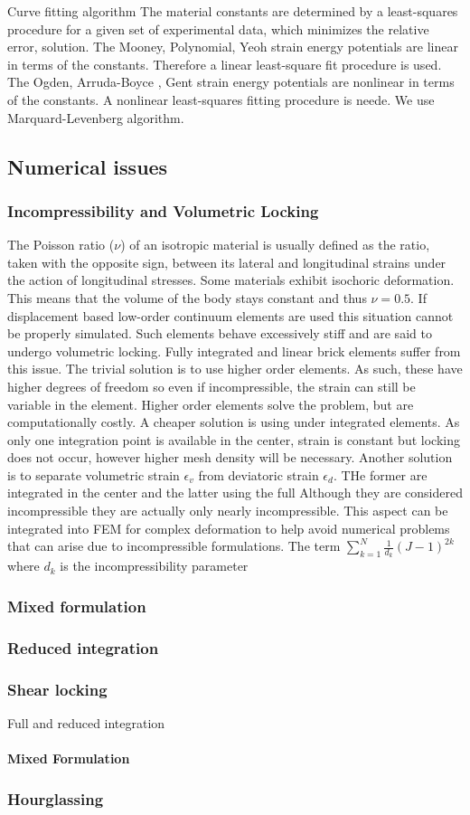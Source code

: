 Curve fitting algorithm
The material constants are determined by a least-squares procedure for a given set of experimental data, which minimizes the relative error, solution.
The Mooney, Polynomial, Yeoh strain energy potentials are linear in terms of the constants. Therefore a linear least-square fit procedure is used.
The Ogden, Arruda-Boyce , Gent strain energy potentials are nonlinear in terms of the constants. A nonlinear least-squares fitting procedure is neede. We use Marquard-Levenberg algorithm.

\subsection{Numerical issues}
\subsubsection{Incompressibility and Volumetric Locking}
The Poisson ratio ($\nu$) of an isotropic material is usually defined as the ratio, taken with the
opposite sign, between its lateral and longitudinal strains under the action of longitudinal
stresses. 
Some materials exhibit isochoric deformation. This means that the volume of the body stays constant and thus $\nu = 0.5$. If displacement based low-order continuum elements are used this situation cannot be properly simulated. Such elements behave excessively stiff and are said to undergo volumetric locking. Fully integrated and linear brick elements suffer from this issue.  The trivial solution is to use higher order elements. As such, these have higher degrees of freedom so even if incompressible, the strain can still be variable in the element. Higher order elements solve the problem, but are computationally costly. A cheaper solution is using under integrated elements. As only one integration point is available in the center, strain is constant but locking does not occur, however higher mesh density will be necessary.  Another solution is to separate volumetric strain $\epsilon_v$ from deviatoric strain $\epsilon_d$. THe former are integrated in the center and the latter using the full
Although they are considered incompressible they are actually only nearly incompressible. This aspect can be integrated into FEM for complex deformation to help avoid numerical problems that can arise due to incompressible formulations. 
The term $\sum^N_{k=1}\frac{1}{d_k}(J-1)^{2k}$ where $d_k$ is the incompressibility parameter
\subsubsection{Mixed formulation}
\subsubsection{Reduced integration}

\subsubsection{Shear locking}
Full and reduced integration 
\paragraph{Mixed Formulation}
\subsubsection{Hourglassing}

